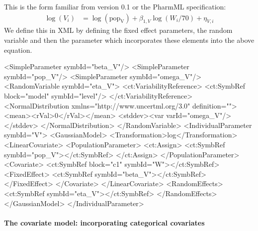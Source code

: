 \documentclass[a4paper,10pt]{article}
\newcommand{\pharmml}{PharmML\xspace}
\begin{document}
This is the form familiar from version 0.1 or the \pharmml specification:
%
\begin{align}
\log(V_i) &= \log(\mathrm{pop_{V}}) + \beta_{1,V}\log(W_i/70) + \eta_{V,i}
\end{align}
%
We define this in XML by defining the fixed effect parameters, the random
variable and then the parameter which incorporates these elements into
the above equation.
%
\begin{xmlcode}
<SimpleParameter symbId="beta_V"/>
<SimpleParameter symbId="pop_V"/>
<SimpleParameter symbId="omega_V"/>
<RandomVariable symbId="eta_V">
    <ct:VariabilityReference>
       <ct:SymbRef block="model" symbId="level"/>
    </ct:VariabilityReference>
    <NormalDistribution xmlns="http://www.uncertml.org/3.0" definition="">
        <mean><rVal>0</rVal></mean>
        <stddev><var varId="omega_V"/></stddev>
    </NormalDistribution>                            
</RandomVariable>
<IndividualParameter symbId="V">
    <GaussianModel>
        <Transformation>log</Transformation>
        <LinearCovariate>
            <PopulationParameter>
                <ct:Assign>
                    <ct:SymbRef symbId="pop_V"></ct:SymbRef>
                </ct:Assign>
            </PopulationParameter>
            <Covariate>
                <ct:SymbRef block="c1" symbId="W"></ct:SymbRef>
                <FixedEffect>
                    <ct:SymbRef symbId="beta_V"></ct:SymbRef>
                </FixedEffect>
            </Covariate>
        </LinearCovariate>
        <RandomEffects>
            <ct:SymbRef symbId="eta_V"></ct:SymbRef>
        </RandomEffects>
    </GaussianModel>
</IndividualParameter>
\end{xmlcode}

\paragraph{The covariate model: incorporating categorical covariates}
\end{document}
